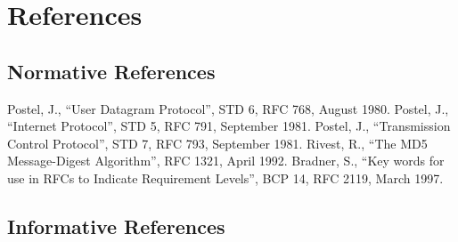 \chapter{References}

\section{Normative References}

\begingroup
  \renewcommand{\chapter}[2]{}
  \begin{thebibliography}{}
     Postel, J., ``User Datagram Protocol'', STD 6, RFC 768, August 1980.
     Postel, J., ``Internet Protocol'', STD 5, RFC 791, September 1981.
     Postel, J., ``Transmission Control Protocol'', STD 7, RFC 793, September 1981.
     Rivest, R., ``The MD5 Message-Digest Algorithm'', RFC 1321, April 1992.
     Bradner, S., ``Key words for use in RFCs to Indicate Requirement Levels'', BCP 14, RFC 2119, March 1997.
  \end{thebibliography}
\endgroup

\section{Informative References}


